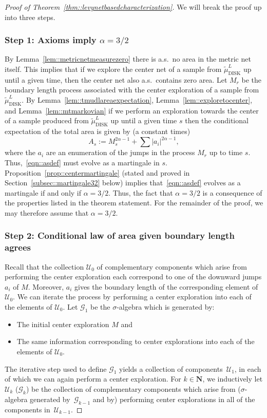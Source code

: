 \documentclass[JEP,XML,SOM,Unicode]{cedram}
\let\mathcal\mathscr
\theoremstyle{plain}
\numberwithin{theorem}{section}
\theoremstyle{definition}
\newcommand{\CU}{{\mathcal U}}
\newcommand{\CG}{{\mathcal G}}
\newcommand{\N}{\mathbf{N}}
\newcommand{\tmudl}{\wt{\mu}_{\mathrm{DISK}}^L}
\let\wt\widetilde
\begin{document}
\begin{proof}[Proof of Theorem~\ref{thm::levynetbasedcharacterization}]
We will break the proof up into three steps.

\subsubsection*{Step 1: Axioms imply $\alpha = 3/2$} By Lemma~\ref{lem::metricnetmeasurezero} there is a.s.\ no area in the metric net itself. This implies that if we explore the center net of a sample from $\tmudl$ up until a given time, then the center net also a.s.\ contains zero area. Let $M_r$ be the boundary length process associated with the center exploration of a sample from $\tmudl$. By Lemma~\ref{lem::tmudlareaexpectation}, Lemma~\ref{lem::exploretocenter}, and Lemma~\ref{lem::mtmarkovian} if we perform an exploration towards the center of a sample produced from $\tmudl$ up until a given time $s$ then the conditional expectation of the total area is given by (a constant times)
\begin{equation}
\label{eqn::asdef}
A_s := M_s^{2\alpha-1} + \sum |a_i|^{2\alpha - 1},
\end{equation}
where the $a_i$ are an enumeration of the jumps in the process $M_r$ up to time $s$. Thus,~\eqref{eqn::asdef} must evolve as a martingale in $s$. Proposition~\ref{prop::centermartingale} (stated and proved in Section~\ref{subsec::martingale32} below) implies that~\eqref{eqn::asdef} evolves as a martingale if and only if $\alpha = 3/2$. Thus, the fact that $\alpha = 3/2$ is a consequence of the properties listed in the theorem statement. For the remainder of the proof, we may therefore assume that $\alpha = 3/2$.

\subsubsection*{Step 2: Conditional law of area given boundary length agrees} Recall that the collection $\CU_0$ of complementary components which arise from performing the center exploration each correspond to one of the downward jumps $a_i$ of $M$. Moreover, $a_i$ gives the boundary length of the corresponding element of $\CU_0$. We can iterate the process by performing a center exploration into each of the elements of $\CU_0$. Let $\CG_1$ be the $\sigma$-algebra which is generated by:
\begin{itemize}
\item The initial center exploration $M$ and
\item The same information corresponding to center explorations into each of the elements of $\CU_0$.
\end{itemize}
The iterative step used to define $\CG_1$ yields a collection of components~$\CU_1$, in each of which we can again perform a center exploration. For $k \in \N$, we inductively let $\CU_k$ (\resp $\CG_k$) be the collection of complementary components which arise from (\resp $\sigma$-algebra generated by~$\CG_{k-1}$ and by) performing center explorations in all of the components in~$\CU_{k-1}$.


\end{proof}
\end{document}
